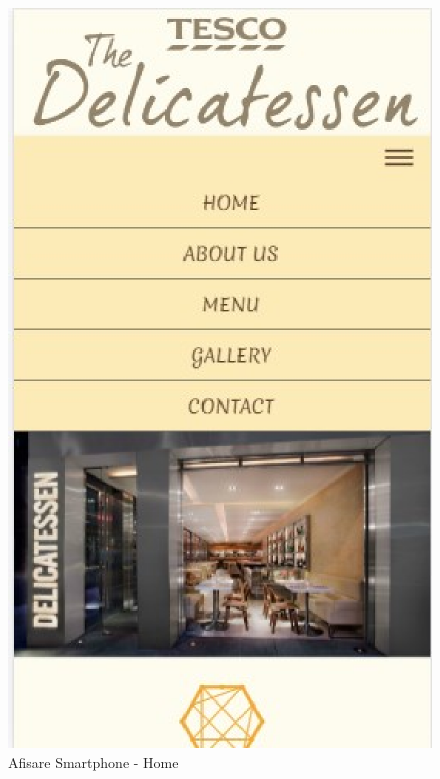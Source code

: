 \documentclass[11pt]{article}
\begin{document}
\begin{figure}[h]
\includegraphics{images/77.eps}
\caption{Afisare Smartphone - Home}
\end{figure}
\end{document}
